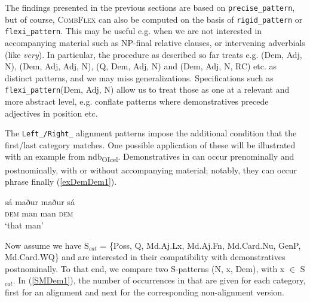 \documentclass[output=paper,colorlinks,citecolor=brown,draft]{langscibook}
\begin{document}
The findings presented in the previous sections are based on \texttt{precise\_pattern}, but of course, \textsc{CombFlex} can also be computed on the basis of \texttt{rigid\_pattern} or \texttt{flexi\_pattern}. This may be useful e.g. when we are not interested in accompanying material such as NP-final relative clauses, or intervening adverbials (like \textit{very}). In particular, the procedure as described so far treats e.g. (Dem, Adj, N), (Dem, Adj, Adj, N), (Q, Dem, Adj, N) and (Dem, Adj, N, RC) etc. as distinct patterns, and we may miss generalizations. Specifications such as  \texttt{flexi\_pattern}(Dem, Adj, N) allow us to treat those as one  at a relevant and more abstract level, e.g. conflate patterns where demonstratives precede adjectives in  position etc. 

The \texttt{Left\_/Right\_} alignment patterns impose the additional condition that the first/last category matches. One possible application of these will be illustrated with an example from ndb\textsubscript{OIcel}. Demonstratives in  can occur prenominally and postnominally, with or without accompanying material; notably, they can occur  phrase finally (\ref{exDemDem1}).


\ea \label{exDemDem1}
    \gll sá maður\hspace{35mm}   maður sá  \\  
             \textsc{dem} man    man \textsc{dem} \\
             \glt `that man'
\z

Now assume we have S$_{cat}$ = {\small \{Poss, Q, Md.Aj.Lx, Md.Aj.Fn, Md.Card.Nu, GenP, Md.Card.WQ\}} and are interested in their compatibility with demonstratives postnominally.  To that end, we compare two S-patterns (N, x, Dem),  with x {\small$\in$}  S$_{cat}$. In (\ref{SMDem1}), the number of occurrences in that  are given for each category, first for an alignment   and next for the corresponding non-alignment version.
\end{document}
